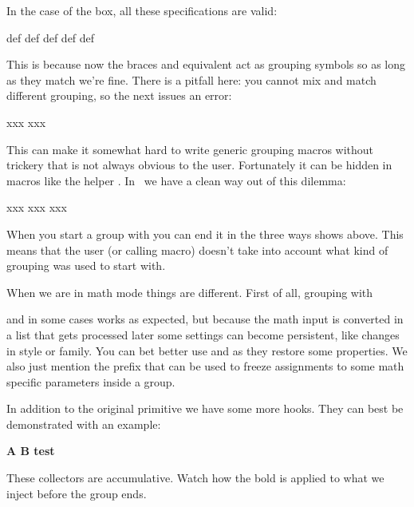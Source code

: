 In the case of the box, all these specifications are valid:

\starttyping
\hbox {def}
\hbox \bgroup def\egroup
\hbox \bgroup def}
\hbox \bgroup d{e\egroup f}
\hbox {def\egroup
\stoptyping

This is because now the braces and equivalent act as grouping symbols so as long
as they match we're fine. There is a pitfall here: you cannot mix and match
different grouping, so the next issues an error:

\starttyping
\bgroup xxx\endgroup   %
\begingroup xxx\egroup %
\stoptyping

This can make it somewhat hard to write generic grouping macros without trickery
that is not always obvious to the user. Fortunately it can be hidden in macros
like the helper \typ {\groupedcommand}. In \LUAMETATEX\ we have a clean way out
of this dilemma:

\starttyping
\beginsimplegroup xxx\endsimplegroup
\beginsimplegroup xxx\endgroup
\beginsimplegroup xxx\egroup
\stoptyping

When you start a group with \typ {\beginsimplegroup} you can end it in the three
ways shows above. This means that the user (or calling macro) doesn't take into
account what kind of grouping was used to start with.

When we are in math mode things are different. First of all, grouping with \typ
{\begingroup} and \typ {\endgroup} in some cases works as expected, but because
the math input is converted in a list that gets processed later some settings can
become persistent, like changes in style or family. You can bet better use \typ
{\beginmathgroup} and \typ {\endmathgroup} as they restore some properties. We
also just mention the \type {\frozen} prefix that can be used to freeze
assignments to some math specific parameters inside a group.

\stopsectionlevel

\startsectionlevel[title=Hooks]

In addition to the original \type {\aftergroup} primitive we have some more
hooks. They can best be demonstrated with an example:

\startbuffer
\begingroup \bf
    \aftergroup   A 
    \atendofgroup B 
    test
\endgroup
\stopbuffer

\typebuffer

These collectors are accumulative. Watch how the bold is applied to what we
inject before the group ends.

}
